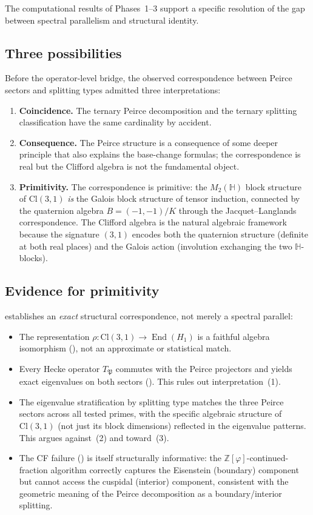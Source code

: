 \documentclass[11pt,a4paper]{article}
\theoremstyle{plain}
\theoremstyle{definition}
\theoremstyle{remark}
\numberwithin{equation}{section}
\providecommand{\Cl}{\mathrm{Cl}}
\providecommand{\HH}{\mathbb{H}}
\providecommand{\ZZ}{\mathbb{Z}}
\providecommand{\fP}{\mathfrak{P}}
\DeclareMathOperator{\End}{End}
\begin{document}
The computational results of Phases~1--3 support a specific resolution of
the gap between spectral parallelism and structural identity.

\subsection{Three possibilities}

Before the operator-level bridge, the observed correspondence between
Peirce sectors and splitting types admitted three interpretations:
\begin{enumerate}[label=(\arabic*)]
\item \textbf{Coincidence.} The ternary Peirce decomposition and the
  ternary splitting classification have the same cardinality by accident.
\item \textbf{Consequence.} The Peirce structure is a consequence of some
  deeper principle that also explains the base-change formulas; the
  correspondence is real but the Clifford algebra is not the fundamental
  object.
\item \textbf{Primitivity.} The correspondence is primitive: the
  $M_2(\HH)$ block structure of $\Cl(3,1)$ \emph{is} the Galois block
  structure of tensor induction, connected by the quaternion algebra
  $B = (-1,-1)/K$ through the Jacquet--Langlands correspondence.  The
  Clifford algebra is the natural algebraic framework because the
  signature $(3,1)$ encodes both the quaternion structure (definite at both
  real places) and the Galois action (involution exchanging the two
  $\HH$-blocks).
\end{enumerate}

\subsection{Evidence for primitivity}

 establishes an \emph{exact} structural correspondence, not
merely a spectral parallel:

\begin{itemize}
\item The representation $\rho: \Cl(3,1) \to \End(H_1)$ is a faithful algebra
  isomorphism (), not an approximate or statistical match.
\item Every Hecke operator $T_\fP$ commutes with the Peirce projectors and
  yields exact eigenvalues on both sectors ().  This rules
  out interpretation~(1).
\item The eigenvalue stratification by splitting type matches the three Peirce
  sectors across all tested primes, with the specific algebraic structure of
  $\Cl(3,1)$ (not just its block dimensions) reflected in the eigenvalue patterns.
  This argues against~(2) and toward~(3).
\item The CF failure () is itself structurally informative:
  the $\ZZ[\varphi]$-continued-fraction algorithm correctly captures the Eisenstein
  (boundary) component but cannot access the cuspidal (interior) component,
  consistent with the geometric meaning of the Peirce decomposition as a
  boundary/interior splitting.
\end{itemize}
\end{document}

